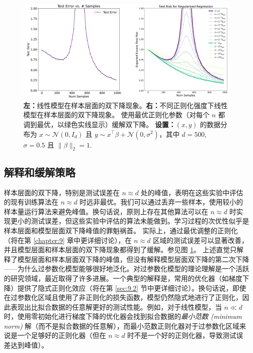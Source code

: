 \begin{figure}[H]
    \centering
    \includegraphics[width=0.9\linewidth]{figs/sample_double_descent.png}
    \caption{\textbf{左：}线性模型在样本层面的双下降现象。\textbf{右：}不同正则化强度下线性模型在样本层面的双下降现象。 使用最优正则化参数（对每个 $n$ 都调到最优，以绿色实线显示）缓解双下降。 \textbf{设置：}$(x, y)$ 的数据分布为 $x \sim \mathcal{N}(0, I_d)$ 且 $y \sim x^\top \beta + \mathcal{N}(0, \sigma^2)$，其中 $d = 500$, $\sigma = 0.5$ 且 $\|\beta\|_2 = 1$.\protect\footnotemark}
    \label{fig:8.11}
\end{figure}

\subsection*{解释和缓解策略}

样本层面的双下降，特别是测试误差在 $n \approx d$ 处的峰值，表明在这些实验中评估的现有训练算法在 $n \approx d$ 时远非最优。我们可以通过丢弃一些样本，使用较小的样本量运行算法来避免峰值。换句话说，原则上存在其他算法可以在 $n \approx d$ 时实现更小的测试误差，但这些实验中评估的算法未能做到。学习过程的次优性似乎是样本层面和模型层面双下降峰值的罪魁祸首。
实际上，通过最优调整的正则化（将在第 \ref{chapter:9} 章中更详细讨论），在 $n \approx d$ 区域的测试误差可以显著改善，并且模型层面和样本层面的双下降现象都得到了缓解。参见图 \ref{fig:8.11}。
上述直觉只解释了模型层面和样本层面双下降的峰值，但没有解释模型层面双下降的第二次下降——为什么过参数化模型能够很好地泛化。对过参数化模型的理论理解是一个活跃的研究领域，最近取得了许多进展。一个典型的解释是，常用的优化器（如梯度下降）提供了隐式正则化效应（将在第 \ref{sec:9.2} 节中更详细讨论）。换句话说，即使在过参数化区域且使用了非正则化的损失函数，模型仍然隐式地进行了正则化，因此表现出比拟合数据的任意解更好的测试性能。例如，对于线性模型，当 $n \ll d$ 时，使用零初始化进行梯度下降的优化器会找到拟合数据的\textit{最小范数 (minimum norm)} 解（而不是拟合数据的任意解），而最小范数正则化器对于过参数化区域来说是一个足够好的正则化器（但在 $n \approx d$ 时不是一个好的正则化器，导致测试误差达到峰值）。

